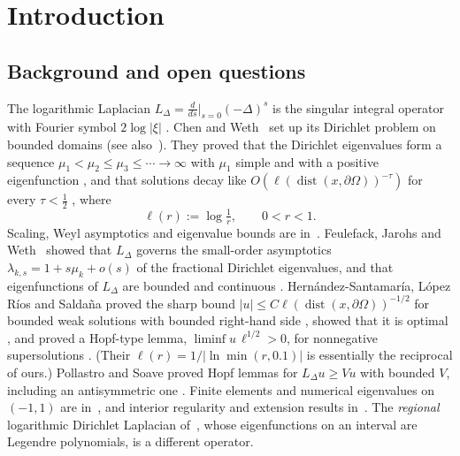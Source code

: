 \documentclass[11pt]{amsart}
\newcommand{\LD}{L_\Delta}
\DeclareMathOperator{\dist}{dist}
\theoremstyle{definition}
\theoremstyle{remark}
\numberwithin{equation}{section}
\begin{document}
\maketitle


\section{Introduction}\label{sec:intro}

\subsection{Background and open questions}\label{sec:background}
The logarithmic Laplacian $\LD=\frac{d}{ds}\big|_{s=0}(-\Delta)^s$ is the singular integral operator with Fourier symbol $2\log|\xi|$ \cite[Thm.~1.1]{CW19}. Chen and Weth~\cite{CW19} set up its Dirichlet problem on bounded domains (see also~\cite{JSW20}). They proved that the Dirichlet eigenvalues form a sequence $\mu_1<\mu_2\le\mu_3\le\cdots\to\infty$ with $\mu_1$ simple and with a positive eigenfunction \cite[Thm.~1.4]{CW19}, and that solutions decay like $O(\ell(\dist(x,\partial\Omega))^{-\tau})$ for every $\tau<\frac12$ \cite[Thm.~1.11]{CW19}, where
\[
\ell(r):=\log\tfrac1r,\qquad 0<r<1 .
\]
Scaling, Weyl asymptotics and eigenvalue bounds are in~\cite{LW21,CV23}. Feulefack, Jarohs and Weth~\cite{FJW22} showed that $\LD$ governs the small-order asymptotics $\lambda_{k,s}=1+s\mu_k+o(s)$ of the fractional Dirichlet eigenvalues, and that eigenfunctions of $\LD$ are bounded and continuous \cite[Cor.~1.4]{FJW22}. Hern\'andez-Santamar\'ia, L\'opez R\'ios and Salda\~na proved the sharp bound $|u|\le C\ell(\dist(x,\partial\Omega))^{-1/2}$ for bounded weak solutions with bounded right-hand side \cite[Thm.~1.1]{HLS25}, showed that it is optimal \cite[Thm.~1.2]{HLS25}, and proved a Hopf-type lemma, $\liminf u\,\ell^{1/2}>0$, for nonnegative supersolutions \cite[Thm.~1.4]{HLS25}. (Their $\ell(r)=1/|\ln\min(r,0.1)|$ is essentially the reciprocal of ours.) Pollastro and Soave proved Hopf lemmas for $\LD u\ge Vu$ with bounded $V$, including an antisymmetric one \cite[Lemmas~3.4, 3.11]{PS25}. Finite elements and numerical eigenvalues on $(-1,1)$ are in~\cite{HJSS25}, and interior regularity and extension results in~\cite{ClS24,JKW26,CHW23}. The \emph{regional} logarithmic Dirichlet Laplacian of~\cite{GM25,RoSt26}, whose eigenfunctions on an interval are Legendre polynomials, is a different operator.
\end{document}
